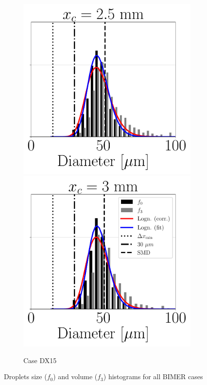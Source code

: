 \begin{figure}[ht]
\begin{subfigure}[b]{1.1\textwidth}
   \hspace*{-0.15in}
   \includegraphics[scale=0.28]{./part3_applications/figures_ch8_resolved/SPRAY_characterization/histograms_size_volume/DX15_xD08p33_histograms}
   \hspace*{-0.15in}
   \includegraphics[scale=0.28]{./part3_applications/figures_ch8_resolved/SPRAY_characterization/histograms_size_volume/DX15_xD10p00_histograms}
	\caption{Case DX15}
\end{subfigure}
\vspace*{-0.2in}
   \caption{Droplets size ($f_0$) and volume ($f_3$) histograms for all BIMER cases}
\label{fig:ch8_jicf_size_volume_histograms_all}
\end{figure}

